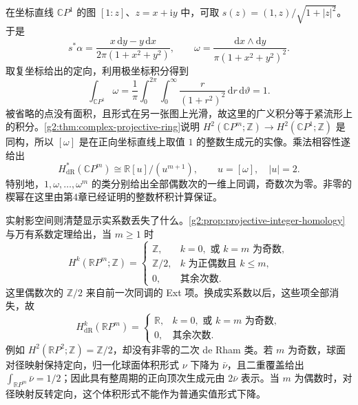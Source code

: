 在坐标直线 \(\mathbb CP^1\) 的图 \([1:z]\)、\(z=x+\mathrm i y\) 中，可取 \(s(z)=(1,z)/\sqrt{1+|z|^2}\)。于是
\[
	s^*\alpha=\frac{x\,\mathrm dy-y\,\mathrm dx}{2\pi(1+x^2+y^2)},
	\qquad \omega=\frac{\mathrm dx\wedge\mathrm dy}{\pi(1+x^2+y^2)^2}.
\]
取复坐标给出的定向，利用极坐标积分得到
\[
	\int_{\mathbb CP^1}\omega
	=\frac1\pi\int_0^{2\pi}\int_0^\infty\frac{r}{(1+r^2)^2}\,\mathrm dr\,\mathrm d\vartheta=1.
\]
被省略的点没有面积，且形式在另一张图上光滑，故这里的广义积分等于紧流形上的积分。\cref{g2:thm:complex-projective-ring}说明 \(H^2(\mathbb CP^m;\mathbb Z)\to H^2(\mathbb CP^1;\mathbb Z)\) 是同构，所以 \([\omega]\) 是在正向坐标直线上取值 \(1\) 的整数生成元的实像。乘法相容性遂给出
\begin{equation}\label{g2:eq:projective-de-rham-ring}
	H^*_{\mathrm{dR}}(\mathbb CP^m)
	\cong\mathbb R[u]/(u^{m+1}),\qquad u=[\omega],\quad |u|=2.
\end{equation}
特别地，\(1,\omega,\ldots,\omega^m\) 的类分别给出全部偶数次的一维上同调，奇数次为零。非零的楔幂在这里由第4章已经证明的整数杯积计算保证。

实射影空间则清楚显示实系数丢失了什么。\cref{g2:prop:projective-integer-homology}与万有系数定理给出，当 \(m\geq1\) 时
\[
	H^k(\mathbb RP^m;\mathbb Z)=
	\begin{cases}
		\mathbb Z,&k=0,\text{ 或 }k=m\text{ 为奇数},\\
		\mathbb Z/2,&k\text{ 为正偶数且 }k\leq m,\\
		0,&\text{其余次数}.
	\end{cases}
\]
这里偶数次的 \(\mathbb Z/2\) 来自前一次同调的 Ext 项。换成实系数以后，这些项全部消失，故
\[
	H^k_{\mathrm{dR}}(\mathbb RP^m)=
	\begin{cases}
		\mathbb R,&k=0,\text{ 或 }k=m\text{ 为奇数},\\
		0,&\text{其余次数}.
	\end{cases}
\]
例如 \(H^2(\mathbb RP^2;\mathbb Z)=\mathbb Z/2\)，却没有非零的二次 de Rham 类。若 \(m\) 为奇数，球面对径映射保持定向，归一化球面体积形式 \(\nu\) 下降为 \(\bar\nu\)，且二重覆盖给出 \(\int_{\mathbb RP^m}\bar\nu=1/2\)；因此具有整周期的正向顶次生成元由 \(2\bar\nu\) 表示。当 \(m\) 为偶数时，对径映射反转定向，这个体积形式不能作为普通实值形式下降。

